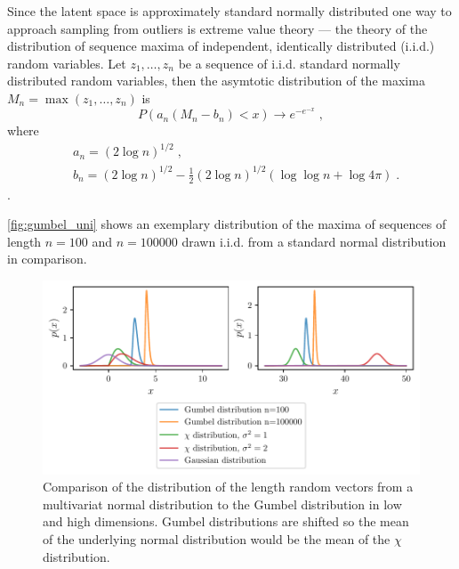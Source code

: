 Since the latent space is approximately standard normally distributed one way
to approach sampling from outliers is extreme value theory --- the theory of
the distribution of sequence maxima of independent, identically distributed
(i.i.d.) random variables. Let $z_1, \dots, z_n$ be a sequence of i.i.d.
standard normally distributed random variables, then the asymtotic distribution
of the maxima $M_n = \max (z_1, \dots, z_n)$ is
\begin{equation}%
	\label{eq:gumbel_distribution}
	P(a_n ( M_n - b_n ) < x) \rightarrow e^{-e^{-x}}\;,
\end{equation}
where
\begin{equation}
	\begin{aligned}%
		\label{eq:gumbel_params}
		 & a_n = (2 \log n )^{1/2}\;,                                         \\
		 & b_n = (2 \log n )^{1/2} - \frac{1}{2} (2 \log n )^{1/2} (\log \log
		n + \log 4 \pi)\;.
	\end{aligned}
\end{equation}
\citep{leadbetterAsymptoticDistributionsExtremes1983}.

\autoref{fig:gumbel_uni} shows an exemplary distribution of the maxima of
sequences of length $n = 100$ and $n = 100000$ drawn i.i.d. from a standard
normal distribution in comparison.
\begin{figure}[htpb]
	\centering
        \includegraphics{figures/samples/gumbel_multi.pdf}
	\caption{Comparison of the distribution of the length random vectors
		from a multivariat normal distribution to the Gumbel distribution in
		low and high dimensions. Gumbel distributions are shifted so
            the mean of the underlying normal distribution would be the mean of
        the $\chi$ distribution.}%
	\label{fig:gumbel_multi}
\end{figure}

